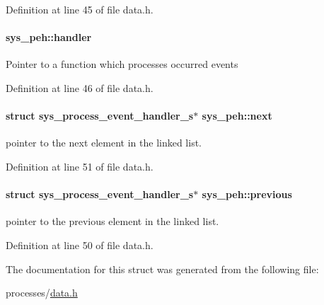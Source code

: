 Definition at line 45 of file data.\+h.

\hypertarget{structsys__peh_a9603c4c65e4e4bf2912d9eb87da7bf51}{}
\paragraph[{handler}]{ sys\+\_\+peh\+::handler}\label{structsys__peh_a9603c4c65e4e4bf2912d9eb87da7bf51}
Pointer to a function which processes occurred events 

Definition at line 46 of file data.\+h.

\hypertarget{structsys__peh_a899a879b50fc6baf6d8d2417eee0e8c5}{}
\paragraph[{next}]{\setlength{\rightskip}{0pt plus 5cm}struct sys\+\_\+process\+\_\+event\+\_\+handler\+\_\+s$\ast$ sys\+\_\+peh\+::next}\label{structsys__peh_a899a879b50fc6baf6d8d2417eee0e8c5}
pointer to the next element in the linked list. 

Definition at line 51 of file data.\+h.

\hypertarget{structsys__peh_abff1942a90e410b023d50b4fd6b6e8ed}{}
\paragraph[{previous}]{\setlength{\rightskip}{0pt plus 5cm}struct sys\+\_\+process\+\_\+event\+\_\+handler\+\_\+s$\ast$ sys\+\_\+peh\+::previous}\label{structsys__peh_abff1942a90e410b023d50b4fd6b6e8ed}
pointer to the previous element in the linked list. 

Definition at line 50 of file data.\+h.



The documentation for this struct was generated from the following file\+:\begin{DoxyCompactItemize}
\item 
processes/\hyperlink{data_8h}{data.\+h}\end{DoxyCompactItemize}
